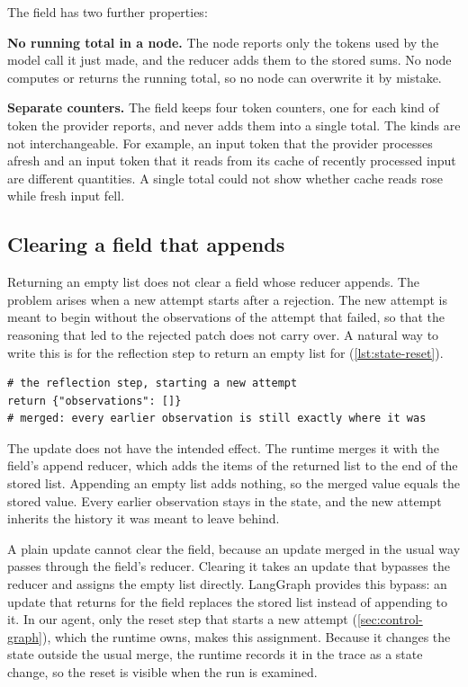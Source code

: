 The field  has two further properties:
\bi
\item \textbf{No running total in a node.} The  node reports only the tokens
used by the model call it just made, and the reducer adds them to the stored sums. No node computes
or returns the running total, so no node can overwrite it by mistake.
\item \textbf{Separate counters.} The field keeps four token counters, one for each kind of token
the provider reports, and never adds them into a single total. The kinds are not interchangeable.
For example, an input token that the provider processes afresh and an input token that it reads from
its cache of recently processed input are different quantities. A single total could not show
whether cache reads rose while fresh input fell.
\ei

\subsection{Clearing a field that appends}
\label{sec:state-reset}

Returning an empty list does not clear a field whose reducer appends. The problem arises when a new
attempt starts after a rejection. The new attempt is meant to begin without the observations of the
attempt that failed, so that the reasoning that led to the rejected patch does not carry over. A
natural way to write this is for the reflection step to return an empty list for
 (\cref{lst:state-reset}).

\begin{lstlisting}[basicstyle=\ttfamily\footnotesize, columns=fixed, basewidth=0.525em, keepspaces=true, breaklines=false, xleftmargin=2pt, xrightmargin=2pt, caption={Illustrative code: an attempted reset that leaves the field unchanged.}, label=lst:state-reset]
# the reflection step, starting a new attempt
return {"observations": []}
# merged: every earlier observation is still exactly where it was
\end{lstlisting}

The update does not have the intended effect. The runtime merges it with the field's append
reducer, which adds the items of the returned list to the end of the stored list. Appending an
empty list adds nothing, so the merged value equals the stored value. Every earlier observation
stays in the state, and the new attempt inherits the history it was meant to leave behind.

A plain update cannot clear the field, because an update merged in the usual way passes through the
field's reducer. Clearing it takes an update that bypasses the reducer and assigns the empty list
directly. LangGraph provides this bypass: an update that returns  for the
field replaces the stored list instead of appending to it. In our agent, only the reset step that
starts a new attempt (\cref{sec:control-graph}), which the runtime owns, makes this assignment. Because it changes the state outside the usual merge, the
runtime records it in the trace as a state change, so the reset is visible when the run is
examined.

